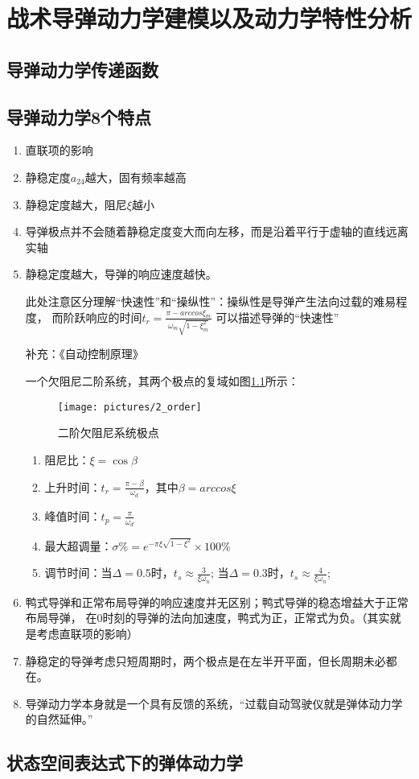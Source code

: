 \chapter{战术导弹动力学建模以及动力学特性分析}
\section{导弹动力学传递函数}
\section{导弹动力学8个特点}
\begin{enumerate}[1)]
    \item 直联项的影响
    \item 静稳定度$a_{24}$越大，固有频率越高
    \item 静稳定度越大，阻尼$\xi$越小
    \item 导弹极点并不会随着静稳定度变大而向左移，而是沿着平行于虚轴的直线远离实轴
    \item 静稳定度越大，导弹的响应速度越快。
    
    {\kaishu 此处注意区分理解“快速性”和“操纵性”：操纵性是导弹产生法向过载的难易程度，
    而阶跃响应的时间$t_r = \frac{\pi - arccos\xi_{\dot{m}}}{\omega_{m}\sqrt{1-\xi_{m}^2}}$
    可以描述导弹的“快速性”
    
    补充：《自动控制原理》
    
    一个欠阻尼二阶系统，其两个极点的复域如图\ref{exrem_point}所示：
    \begin{figure}[H]
        \centering
        \texttt{[image: pictures/2\_order]}
        \caption{二阶欠阻尼系统极点}
        \label{exrem_point}
    \end{figure}
    \begin{enumerate}[i]
        \item 阻尼比：$\xi = \cos\beta$ 
        \item 上升时间：$t_r = \frac{\pi-\beta}{\omega_d}$，其中$\beta = arccos\xi$
        \item 峰值时间：$t_p = \frac{\pi}{\omega_d}$
        \item 最大超调量：$\sigma\% = e^{-\pi\xi\sqrt{1-\xi^2}}\times100\%$
        \item 调节时间：当$\Delta = 0.5$时，$t_s\approx \frac{3}{\xi\omega_n}$;
                        当$\Delta = 0.3$时，$t_s\approx \frac{4}{\xi\omega_n}$;
    \end{enumerate}
    }
    \item 鸭式导弹和正常布局导弹的响应速度并无区别；鸭式导弹的稳态增益大于正常布局导弹，
    在0时刻的导弹的法向加速度，鸭式为正，正常式为负。（其实就是考虑直联项的影响）
    \item 静稳定的导弹考虑只短周期时，两个极点是在左半开平面，但长周期未必都在。
    \item 导弹动力学本身就是一个具有反馈的系统，“过载自动驾驶仪就是弹体动力学的自然延伸。”
\end{enumerate}
\section{状态空间表达式下的弹体动力学}